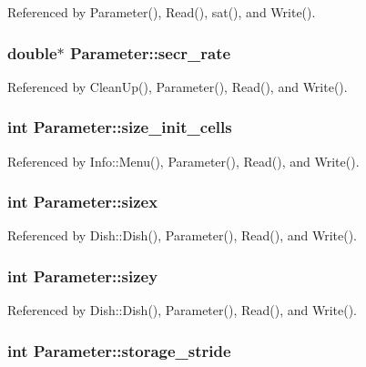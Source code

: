 Referenced by Parameter(), Read(), sat(), and Write().

\subsubsection[{secr\-\_\-rate}]{\setlength{\rightskip}{0pt plus 5cm}double$\ast$ Parameter\-::secr\-\_\-rate}\label{classParameter_a7a41d757395efdd11f1c156ff57650dc}


Referenced by Clean\-Up(), Parameter(), Read(), and Write().

\subsubsection[{size\-\_\-init\-\_\-cells}]{\setlength{\rightskip}{0pt plus 5cm}int Parameter\-::size\-\_\-init\-\_\-cells}\label{classParameter_a69a0eb4b7cc3c10f5e76b4993dc0e286}


Referenced by Info\-::\-Menu(), Parameter(), Read(), and Write().

\subsubsection[{sizex}]{\setlength{\rightskip}{0pt plus 5cm}int Parameter\-::sizex}\label{classParameter_a0db8dffd08c8c9ba6075395997216b75}


Referenced by Dish\-::\-Dish(), Parameter(), Read(), and Write().

\subsubsection[{sizey}]{\setlength{\rightskip}{0pt plus 5cm}int Parameter\-::sizey}\label{classParameter_a3e347ac0e13db69c015b9e9fb22ee329}


Referenced by Dish\-::\-Dish(), Parameter(), Read(), and Write().

\subsubsection[{storage\-\_\-stride}]{\setlength{\rightskip}{0pt plus 5cm}int Parameter\-::storage\-\_\-stride}\label{classParameter_a725af0001c9e86c26b87decbe5729ef3}


